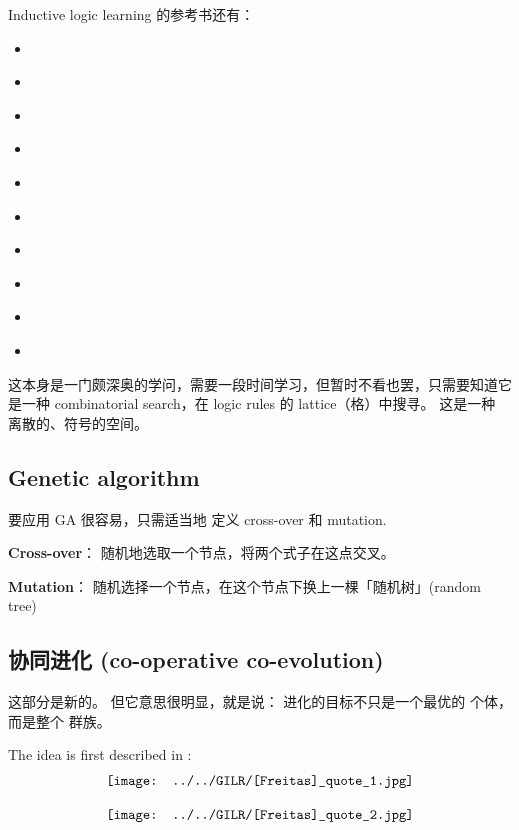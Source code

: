 Inductive logic learning 的参考书还有：
\begin{itemize}
	\item {} \parencite{Raedt2008a}
	\item {} \parencite{Bergadano1996}
	\item {} \parencite{Lloyd2003}
	\item {} \parencite{Flach1994}
	\item {} \parencite{Fuernkranz2012}
	\item {} \parencite{Muggleton2015}
	\item {} \parencite{Raedt2016}
	\item {} \parencite{Cussens2000}
	\item {} \parencite{Dzeroski2001a}
	\item {} \parencite{Hitzler2011}
\end{itemize}

这本身是一门颇深奥的学问，需要一段时间学习，但暂时不看也罢，只需要知道它是一种 combinatorial search，在 logic rules 的 lattice（格）中搜寻。 这是一种 离散的、符号的空间。

\subsection{Genetic algorithm}

要应用 GA 很容易，只需适当地 定义 cross-over 和 mutation.

\textbf{Cross-over}： 随机地选取一个节点，将两个式子在这点交叉。 

\textbf{Mutation}： 随机选择一个节点，在这个节点下换上一棵「随机树」(random tree)

\subsection{协同进化 (co-operative co-evolution)}

这部分是新的。 但它意思很明显，就是说： 进化的目标不只是一个最优的 个体，而是整个 群族。

The idea is first described in \parencite{Freitas2002}:
\begin{equation}
\vcenter{\hbox{\texttt{[image: ../../GILR/[Freitas]\_quote\_1.jpg]}}}
\end{equation}

\begin{equation}
\vcenter{\hbox{\texttt{[image: ../../GILR/[Freitas]\_quote\_2.jpg]}}}
\end{equation}

